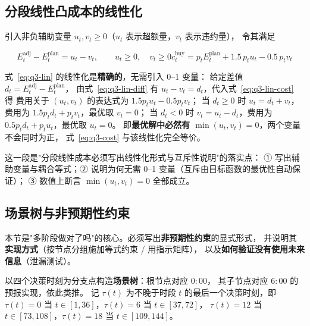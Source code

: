 \subsection{分段线性凸成本的线性化}

引入非负辅助变量 \(u_t,v_t\ge 0\)（\(u_t\) 表示超额量，\(v_t\) 表示违约量），
令其满足

\begin{subequations}\label{eq:q3-lin}
  \begin{equation}
    E^{\text{adj}}_t-E^{\text{plan}}_t=u_t-v_t,\qquad u_t\ge 0,\quad v_t\ge 0
    \label{eq:q3-lin-diff}
  \end{equation}
  \begin{equation}
    c_t^{\text{buy}}=p_t E^{\text{plan}}_t+1.5\,p_t u_t-0.5\,p_t v_t
    \label{eq:q3-lin-cost}
  \end{equation}
\end{subequations}

式~\eqref{eq:q3-lin} 的线性化是\textbf{精确的}，无需引入 0--1 变量：
给定差值 \(d_t=E^{\text{adj}}_t-E^{\text{plan}}_t\)，
由式~\eqref{eq:q3-lin-diff} 有 \(u_t-v_t=d_t\)，代入式~\eqref{eq:q3-lin-cost} 得
费用关于 \((u_t,v_t)\) 的表达式为 \(1.5p_tu_t-0.5p_tv_t\)；
当 \(d_t\ge 0\) 时 \(u_t=d_t+v_t\)，费用为 \(1.5p_td_t+p_tv_t\)，最优取 \(v_t=0\)；
当 \(d_t<0\) 时 \(v_t=u_t-d_t\)，费用为 \(0.5p_td_t+p_tu_t\)，最优取 \(u_t=0\)。
即\textbf{最优解中必然有 \(\min(u_t,v_t)=0\)}，两个变量不会同时为正，
式~\eqref{eq:q3-cost} 与该线性化完全等价。

\begin{guideblock}
这一段是"分段线性成本必须写出线性化形式与互斥性说明"的落实点：
① 写出辅助变量与耦合等式；② 说明为何无需 0--1 变量（互斥由目标函数的最优性自动保证）；
③ 数值上断言 \(\min(u_t,v_t)=0\) 全部成立。
\end{guideblock}

\subsection{场景树与非预期性约束}

\begin{guideblock}
本节是"多阶段做对了吗"的核心。必须写出\textbf{非预期性约束}的显式形式，
并说明其\textbf{实现方式}（按节点分组施加等式约束 / 用指示矩阵），
以及\textbf{如何验证没有使用未来信息}（泄漏测试）。
\end{guideblock}

以四个决策时刻为分支点构造\textbf{场景树}：根节点对应 \(0{:}00\)，
其子节点对应 \(6{:}00\) 的预报实现，依此类推。
记 \(\tau(t)\) 为不晚于时段 \(t\) 的最后一个决策时刻，即
\(\tau(t)=0\) 当 \(t\in[1,36]\)，\(\tau(t)=6\) 当 \(t\in[37,72]\)，
\(\tau(t)=12\) 当 \(t\in[73,108]\)，\(\tau(t)=18\) 当 \(t\in[109,144]\)。

